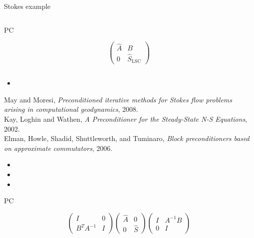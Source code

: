 \begin{frame}[fragile]{Stokes example}
\begin{overprint}
\begin{columns}
\begin{column}[t]{0.33\textwidth}
\Huge\begin{center}PC\end{center}
\begin{equation*}
\begin{pmatrix}
\hat A & B \\
     0 & \hat S_{\mathrm{LSC}}
\end{pmatrix}
\end{equation*}
\end{column}
\end{columns}
\begin{itemize}
  \item[] 
\end{itemize}
\scriptsize
  May and Moresi, \emph{Preconditioned iterative methods for Stokes flow problems arising in computational geodynamics}, 2008.\\
  Kay, Loghin and Wathen, \emph{A Preconditioner for the Steady-State N-S Equations}, 2002.\\
  Elman, Howle, Shadid, Shuttleworth, and Tuminaro, \emph{Block preconditioners based on approximate commutators}, 2006.
%
\begin{itemize}
  \item[] 
  \item[] 
  \item[] 
\end{itemize}
\Huge
\begin{center}PC\end{center}
\begin{equation*}
\begin{pmatrix}
      I        &  0 \\
    B^T A^{-1}  &  I
\end{pmatrix}
\begin{pmatrix}
\hat A & 0 \\
    0  & \hat S
\end{pmatrix}
\begin{pmatrix}
 I & A^{-1} B \\
 0 & I
\end{pmatrix}
\end{equation*}
\end{overprint}
\end{frame}
%
%
\ifx\@restTalk\@empty
